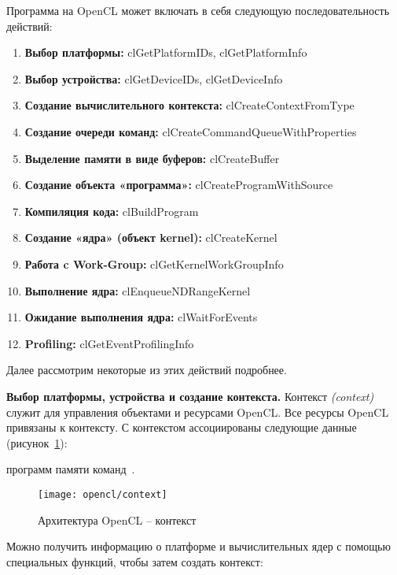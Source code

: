Программа на OpenCL может включать в себя следующую последовательность действий:
    \begin{enumerate}
        \item\textbf{Выбор платформы:} clGetPlatformIDs, clGetPlatformInfo
        \item\textbf{Выбор устройства:} clGetDeviceIDs, clGetDeviceInfo
        \item\textbf{Создание вычислительного контекста:} cl\-Create\-Context\-From\-Type
        \item\textbf{Создание очереди команд:} cl\-Create\-Command\-Queue\-With\-Pro\-per\-ties
        \item\textbf{Выделение памяти в виде буферов:} clCreateBuffer
        \item\textbf{Создание объекта «программа»:} clCreateProgramWithSource
        \item\textbf{Компиляция кода:} clBuildProgram
        \item\textbf{Создание «ядра» (объект kernel):} clCreateKernel
        \item\textbf{Работа c Work-Group:} clGetKernelWorkGroupInfo 
        \item\textbf{Выполнение ядра:} clEnqueueNDRangeKernel 
        \item\textbf{Ожидание выполнения ядра:} clWaitForEvents 
        \item\textbf{Profiling:} clGetEventProfilingInfo
    \end{enumerate}

Далее рассмотрим некоторые из этих действий подробнее.

\textbf{Выбор платформы, устройства и создание контекста.} Контекст \textit{(context)} служит для управления объектами и ресурсами OpenCL. Все ресурсы OpenCL привязаны к контексту. С контекстом ассоциированы следующие данные (рисунок~\ref{OpenCLContext:image}):

\begin{itemize}
     программ
     памяти
     команд~\cite{Bastrakov2011}.
\end{itemize}

\begin{figure}[H]
    \texttt{[image: opencl/context]}
    \caption{Архитектура OpenCL -- контекст}
    \label{OpenCLContext:image}
\end{figure}

Можно получить информацию о платформе и вычислительных ядер с помощью специальных функций, чтобы затем создать контекст:

